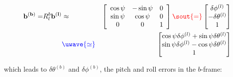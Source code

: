\documentclass[12pt,twoside,english]{article}\usepackage[]{graphicx}\usepackage[]{color}
\providecommand{\DIFadd}[1]{{\protect\color{blue}\uwave{#1}}} %
\providecommand{\DIFdel}[1]{{\protect\color{red}\sout{#1}}}                      %
\providecommand{\DIFaddbegin}{} %
\providecommand{\DIFaddend}{} %
\providecommand{\DIFdelbegin}{} %
\providecommand{\DIFdelend}{} %
\begin{document}
{{%
\DIFdelend \begin{eqnarray}
\mathbf{b^{(b)}=}R_{l}^{b}\mathbf{b^{(l)}} & \approx & \left[\begin{array}{ccc}
\cos\psi & -\sin\psi & 0\\
\sin\psi & \cos\psi & 0\\
0 & 0 & 1
\end{array}\right]\DIFdelbegin %
\DIFdel{=}%
\DIFdelend \DIFaddbegin \begin{bmatrix}\delta\phi^{(l)}\\
-\delta\theta^{(l)}\\
1
\end{bmatrix}\DIFaddend \label{eq:b-vector-in-b-frame}\DIFaddbegin \\
 & \DIFadd{\simeq }& \begin{bmatrix}\cos\psi\delta\phi^{(l)}+\sin\psi\delta\theta^{(l)}\\
\sin\psi\delta\phi^{(l)}-\cos\psi\delta\theta^{(l)}\\
1
\end{bmatrix}
\DIFaddend \end{eqnarray}
\DIFdelbegin %

\DIFdelend which leads to $\delta\theta^{(b)}$ and $\delta\phi^{(b)}$, the
pitch and roll errors in the $b$-frame:

}}
\end{document}
